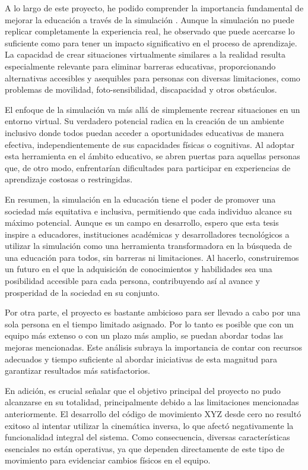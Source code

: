 A lo largo de este proyecto, he podido comprender la importancia fundamental de mejorar la educación a través de la simulación \cite{Simulacion}. Aunque la simulación no puede replicar completamente la experiencia real, he observado que puede acercarse lo suficiente como para tener un impacto significativo en el proceso de aprendizaje. La capacidad de crear situaciones virtualmente similares a la realidad resulta especialmente relevante para eliminar barreras educativas, proporcionando alternativas accesibles y asequibles para personas con diversas limitaciones, como problemas de movilidad, foto-sensibilidad, discapacidad y otros obstáculos.

El enfoque de la simulación va más allá de simplemente recrear situaciones en un entorno virtual. Su verdadero potencial radica en la creación de un ambiente inclusivo donde todos puedan acceder a oportunidades educativas de manera efectiva, independientemente de sus capacidades físicas o cognitivas. Al adoptar esta herramienta en el ámbito educativo, se abren puertas para aquellas personas que, de otro modo, enfrentarían dificultades para participar en experiencias de aprendizaje costosas o restringidas.

En resumen, la simulación en la educación tiene el poder de promover una sociedad más equitativa e inclusiva, permitiendo que cada individuo alcance su máximo potencial. Aunque es un campo en desarrollo, espero que esta tesis inspire a educadores, instituciones académicas y desarrolladores tecnológicos a utilizar la simulación como una herramienta transformadora en la búsqueda de una educación para todos, sin barreras ni limitaciones. Al hacerlo, construiremos un futuro en el que la adquisición de conocimientos y habilidades sea una posibilidad accesible para cada persona, contribuyendo así al avance y prosperidad de la sociedad en su conjunto.

Por otra parte, el proyecto es bastante ambicioso para ser llevado a cabo por una sola persona en el tiempo limitado asignado. Por lo tanto es posible que con un equipo más extenso o con un plazo más amplio, se puedan abordar todas las mejoras mencionadas. Este análisis subraya la importancia de contar con recursos adecuados y tiempo suficiente al abordar iniciativas de esta magnitud para garantizar resultados más satisfactorios.

En adición, es crucial señalar que el objetivo principal del proyecto no pudo alcanzarse en su totalidad, principalmente debido a las limitaciones mencionadas anteriormente. El desarrollo del código de movimiento XYZ desde cero no resultó exitoso al intentar utilizar la cinemática inversa, lo que afectó negativamente la funcionalidad integral del sistema. Como consecuencia, diversas características esenciales no están operativas, ya que dependen directamente de este tipo de movimiento para evidenciar cambios físicos en el equipo.

